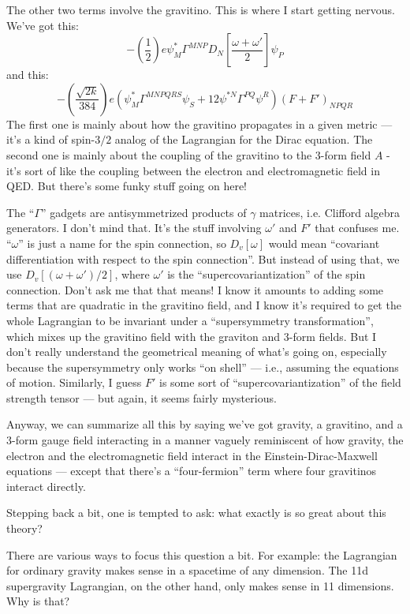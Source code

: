 \documentclass{article}
\begin{document}
The other two terms involve the gravitino. This is where I start getting
nervous. We've got this:
\[-\left(\frac{1}{2}\right) e\psi_M^* \Gamma^{MNP} D_N\left[\frac{\omega+\omega'}{2}\right]\psi_P\]
and this:
\[- \left(\frac{\sqrt{2k}}{384}\right) e(\psi_M^* \Gamma^{MNPQRS}\psi_S + 12\psi^{*N}\Gamma^{PQ}\psi^R)(F+F')_{NPQR}\]
The first one is mainly about how the gravitino propagates in a given
metric --- it's a kind of spin-\(3/2\) analog of the Lagrangian for the
Dirac equation. The second one is mainly about the coupling of the
gravitino to the 3-form field \(A\) - it's sort of like the coupling
between the electron and electromagnetic field in QED. But there's some
funky stuff going on here!

The ``\(\Gamma\)'' gadgets are antisymmetrized products of \(\gamma\)
matrices, i.e. Clifford algebra generators. I don't mind that. It's the
stuff involving \(\omega'\) and \(F'\) that confuses me. ``\(\omega\)''
is just a name for the spin connection, so \(D_v[\omega]\) would mean
``covariant differentiation with respect to the spin connection''. But
instead of using that, we use \(D_v[(\omega + \omega')/2]\), where
\(\omega'\) is the ``supercovariantization'' of the spin connection.
Don't ask me that that means! I know it amounts to adding some terms
that are quadratic in the gravitino field, and I know it's required to
get the whole Lagrangian to be invariant under a ``supersymmetry
transformation'', which mixes up the gravitino field with the graviton
and 3-form fields. But I don't really understand the geometrical meaning
of what's going on, especially because the supersymmetry only works ``on
shell'' --- i.e., assuming the equations of motion. Similarly, I guess
\(F'\) is some sort of ``supercovariantization'' of the field strength
tensor --- but again, it seems fairly mysterious.

Anyway, we can summarize all this by saying we've got gravity, a
gravitino, and a 3-form gauge field interacting in a manner vaguely
reminiscent of how gravity, the electron and the electromagnetic field
interact in the Einstein-Dirac-Maxwell equations --- except that there's
a ``four-fermion'' term where four gravitinos interact directly.

Stepping back a bit, one is tempted to ask: what exactly is so great
about this theory?

There are various ways to focus this question a bit. For example: the
Lagrangian for ordinary gravity makes sense in a spacetime of any
dimension. The 11d supergravity Lagrangian, on the other hand, only
makes sense in 11 dimensions. Why is that?
\end{document}
